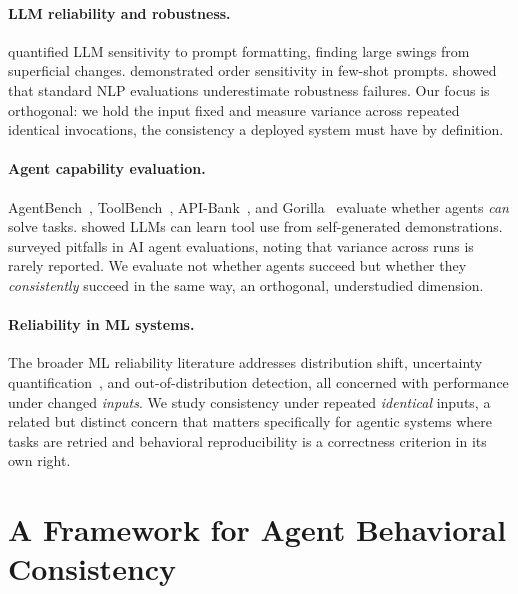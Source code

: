 \documentclass[letterpaper]{article}
\begin{document}
\paragraph{LLM reliability and robustness.}
\citet{sclar2024quantifying} quantified LLM sensitivity to prompt formatting,
finding large swings from superficial changes.
\citet{lu2022fantastically} demonstrated order sensitivity in few-shot prompts.
\citet{perez2022true} showed that standard NLP evaluations underestimate
robustness failures.
Our focus is orthogonal: we hold the input fixed and measure variance across
repeated identical invocations, the consistency a deployed system must have by
definition.

\paragraph{Agent capability evaluation.}
AgentBench~\citep{liu2023agentbench}, ToolBench~\citep{qin2023toolllm},
API-Bank~\citep{li2023apibank}, and Gorilla~\citep{patil2023gorilla} evaluate
whether agents \emph{can} solve tasks.
\citet{schick2023toolformer} showed LLMs can learn tool use from self-generated
demonstrations.
\citet{kapoor2024ai} surveyed pitfalls in AI agent evaluations, noting that
variance across runs is rarely reported.
We evaluate not whether agents succeed but whether they \emph{consistently} succeed
in the same way, an orthogonal, understudied dimension.

\paragraph{Reliability in ML systems.}
The broader ML reliability literature addresses distribution shift,
uncertainty quantification~\citep{lakshminarayanan2017simple}, and
out-of-distribution detection, all concerned with performance under changed
\emph{inputs}.
We study consistency under repeated \emph{identical} inputs, a related but distinct
concern that matters specifically for agentic systems where tasks are retried and
behavioral reproducibility is a correctness criterion in its own right.

\section{A Framework for Agent Behavioral Consistency}
\end{document}
